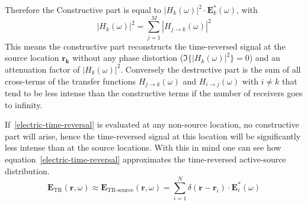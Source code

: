 Therefore the Constructive part is equal to \(|H_k(\omega)|^2 \cdot \bm{E}^*_k(\omega)\), with
\begin{equation}
    |H_k(\omega)|^2 = \sum_{j=1}^{M} |H_{j\rightarrow k}(\omega)|^2
\end{equation}
This means the constructive part reconstructs the time-reversed signal at the source location \(\bm{r_k}\) without any phase distortion (\(\Im \{{|H_k(\omega)|^2}\} = 0\)) and an attenuation factor of \(|H_k(\omega)|^2\).
Conversely the destructive part is the sum of all cross-terms of the transfer functions \(H_{j\rightarrow k}(\omega)\) and \(H_{i\rightarrow j}(\omega)\) with \(i \neq k\) that tend to be less intense than the constructive terms if the number of receivers goes to infinity.

If~\eqref{electric-time-reversal} is evaluated at any non-source location, no constructive part will arise, hence the time-reversed signal at this location will be significantly less intense than at the source locations.
With this in mind one can see how equation~\eqref{electric-time-reversal} approximates the time-reversed active-source distribution. 
\begin{equation}
    \bm{E}_{\text{TR}}(\bm{r}, \omega) \approx \bm{E}_{\text{TR-source}}(\bm{r}, \omega) =  \sum_{i=1}^{N} \delta(\bm{r}-\bm{r}_i) \cdot \bm{E}^*_i(\omega)
\end{equation}

